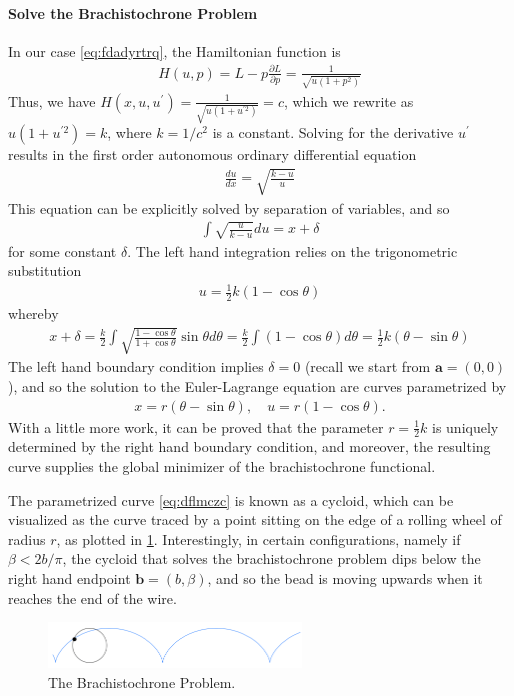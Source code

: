 \documentclass{article}
\begin{document}
\paragraph{Solve the Brachistochrone Problem}
In our case \cref{eq:fdadyrtrq}, the Hamiltonian function is
\begin{align*}
H(u, p)=L-p \frac{\partial L}{\partial p}=\frac{1}{\sqrt{u\left(1+p^{2}\right)}}
\end{align*}
Thus, we have
$H\left(x, u, u^{\prime}\right)=\frac{1}{\sqrt{u\left(1+u^{\prime 2}\right)}}=c$,  which we rewrite as $u\left(1+u^{\prime 2}\right)=k$,
where $k=1 / c^{2}$ is a constant. Solving for the derivative $u^{\prime}$ results in the first order autonomous ordinary differential equation
\begin{align*}
\frac{d u}{d x}=\sqrt{\frac{k-u}{u}}
\end{align*}
This equation can be explicitly solved by separation of variables, and so
\begin{align*}
\int \sqrt{\frac{u}{k-u}} d u=x+\delta
\end{align*}
for some constant $\delta$. The left hand integration relies on the trigonometric substitution
\begin{align*}
u=\frac{1}{2} k(1-\cos \theta)
\end{align*}
whereby
\begin{align*}
x+\delta=\frac{k}{2} \int \sqrt{\frac{1-\cos \theta}{1+\cos \theta}} \sin \theta d \theta=\frac{k}{2} \int(1-\cos \theta) d \theta=\frac{1}{2} k(\theta-\sin \theta)
\end{align*}
The left hand boundary condition implies $\delta=0$ (recall we start from $\mathbf{a}=(0,0)$), and so the solution to the Euler-Lagrange equation are curves parametrized by
\begin{align}
x=r(\theta-\sin \theta), \quad u=r(1-\cos \theta) .\label{eq:dflmczc}
\end{align}
With a little more work, it can be proved that the parameter $r=\frac{1}{2} k$ is uniquely determined by the right hand boundary condition, and moreover, the resulting curve supplies the global minimizer of the brachistochrone functional.

The parametrized curve \cref{eq:dflmczc} is known as a cycloid, which can be visualized as the curve traced by a point sitting on the edge of a rolling wheel of radius $r$, as plotted in \cref{fig:Brachistochrone}. Interestingly, in certain configurations, namely if $\beta<2 b / \pi$, the cycloid that solves the brachistochrone problem dips below the right hand endpoint $\mathbf{b}=(b, \beta)$, and so the bead is moving upwards when it reaches the end of the wire.
\begin{figure}[ht]
    \centering
    \includegraphics[width=0.6\textwidth]{Figs/a6.png}
    \caption{The Brachistochrone Problem.}
    \label{fig:Brachistochrone}
\end{figure}
\end{document}
